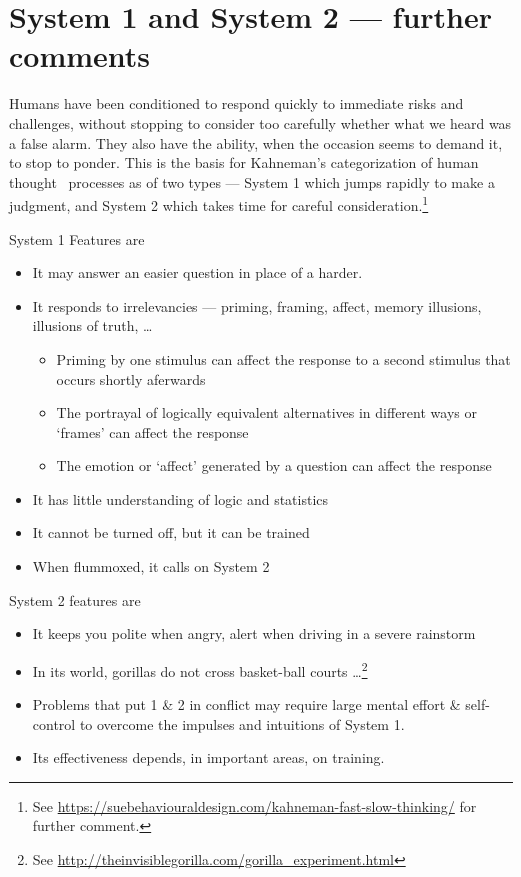 \documentclass[
  10ptls,
  b5paper]{book}
\providecommand{\tightlist}{%
  \setlength{\itemsep}{0pt}\setlength{\parskip}{0pt}}
\begin{document}
\section{System 1 and System 2 --- further comments}\label{system-1-and-system-2-further-comments}

Humans have been conditioned to respond quickly to immediate risks and challenges, without stopping to consider too carefully whether what we heard was a false alarm. They also have the ability, when the occasion seems to demand it, to stop to ponder. This is the basis for Kahneman's categorization of human thought~ processes as of two types --- System 1 which jumps rapidly to make a judgment, and System 2 which takes time for careful consideration.\footnote{See \url{https://suebehaviouraldesign.com/kahneman-fast-slow-thinking/} for further comment.}

System 1 Features are

\begin{itemize}
\tightlist
\item
  It may answer an easier question in place of a harder.
\item
  It responds to irrelevancies --- priming, framing, affect, memory illusions, illusions of truth, \ldots{}

  \begin{itemize}
  \tightlist
  \item
    Priming by one stimulus can affect the response to a second
    stimulus that occurs shortly aferwards
  \item
    The portrayal of logically equivalent alternatives in different
    ways or `frames' can affect the response
  \item
    The emotion or `affect' generated by a question can affect the
    response
  \end{itemize}
\item
  It has little understanding of logic and statistics
\item
  It cannot be turned off, but it can be trained
\item
  When flummoxed, it calls on System 2
\end{itemize}

System 2 features are

\begin{itemize}
\tightlist
\item
  It keeps you polite when angry, alert when driving in a severe
  rainstorm
\item
  In its world, gorillas do not cross basket-ball courts \ldots{}\footnote{See \url{http://theinvisiblegorilla.com/gorilla_experiment.html}}
\item
  Problems that put 1 \& 2 in conflict may require large mental effort \& self-control to overcome the impulses and intuitions of System 1.
\item
  Its effectiveness depends, in important areas, on training.
\end{itemize}
\end{document}
